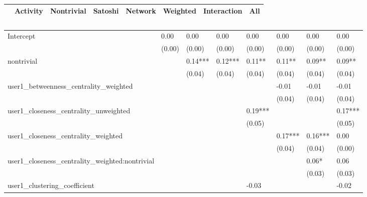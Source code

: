 \begin{table}
\caption{}
\begin{center}
\begin{tabular}{lccccccc}
\hline
                                               & Activity & Nontrivial & Satoshi & Network & Weighted & Interaction &   All    \\
\hline
\hline
\end{tabular}
\begin{tabular}{llllllll}
Intercept                                      & 0.00     & 0.00       & 0.00    & 0.00    & 0.00     & 0.00        & 0.00     \\
                                               & (0.00)   & (0.00)     & (0.00)  & (0.00)  & (0.00)   & (0.00)      & (0.00)   \\
nontrivial                                     &          & 0.14***    & 0.12*** & 0.11**  & 0.11**   & 0.09**      & 0.09**   \\
                                               &          & (0.04)     & (0.04)  & (0.04)  & (0.04)   & (0.04)      & (0.04)   \\
user1_betweenness_centrality_weighted          &          &            &         &         & -0.01    & -0.01       & -0.01    \\
                                               &          &            &         &         & (0.04)   & (0.04)      & (0.04)   \\
user1_closeness_centrality_unweighted          &          &            &         & 0.19*** &          &             & 0.17***  \\
                                               &          &            &         & (0.05)  &          &             & (0.05)   \\
user1_closeness_centrality_weighted            &          &            &         &         & 0.17***  & 0.16***     & 0.00     \\
                                               &          &            &         &         & (0.04)   & (0.04)      & (0.00)   \\
user1_closeness_centrality_weighted:nontrivial &          &            &         &         &          & 0.06*       & 0.06     \\
                                               &          &            &         &         &          & (0.03)      & (0.03)   \\
user1_clustering_coefficient                   &          &            &         & -0.03   &          &             & -0.02    \\

\end{tabular}
\end{center}
\end{table}
